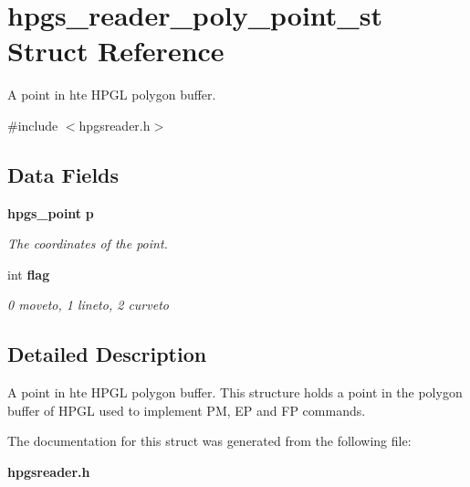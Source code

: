 \section{hpgs\_\-reader\_\-poly\_\-point\_\-st Struct Reference}
\label{structhpgs__reader__poly__point__st}


A point in hte HPGL polygon buffer.  




{\ttfamily \#include $<$hpgsreader.h$>$}

\subsection*{Data Fields}
\begin{DoxyCompactItemize}
\item 
{\bf hpgs\_\-point} {\bf p}\label{structhpgs__reader__poly__point__st_a43e696e9d5d92fa2008401d433a89345}

\begin{DoxyCompactList}\small\item\em The coordinates of the point. \item\end{DoxyCompactList}\item 
int {\bf flag}\label{structhpgs__reader__poly__point__st_af1d9dc9590231f824b5b424dccbf89c1}

\begin{DoxyCompactList}\small\item\em 0 moveto, 1 lineto, 2 curveto \item\end{DoxyCompactList}\end{DoxyCompactItemize}


\subsection{Detailed Description}
A point in hte HPGL polygon buffer. This structure holds a point in the polygon buffer of HPGL used to implement PM, EP and FP commands. 

The documentation for this struct was generated from the following file:\begin{DoxyCompactItemize}
\item 
{\bf hpgsreader.h}\end{DoxyCompactItemize}
